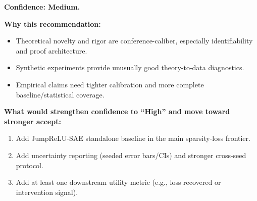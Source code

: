 \documentclass[11pt,a4paper]{article}
\begin{document}
\textbf{Confidence: Medium.}

\textbf{Why this recommendation:}
\begin{itemize}[leftmargin=*]
\item Theoretical novelty and rigor are conference-caliber, especially identifiability and proof architecture.
\item Synthetic experiments provide unusually good theory-to-data diagnostics.
\item Empirical claims need tighter calibration and more complete baseline/statistical coverage.
\end{itemize}

\textbf{What would strengthen confidence to ``High'' and move toward stronger accept:}
\begin{enumerate}[leftmargin=*]
\item Add JumpReLU-SAE standalone baseline in the main sparsity-loss frontier.
\item Add uncertainty reporting (seeded error bars/CIs) and stronger cross-seed protocol.
\item Add at least one downstream utility metric (e.g., loss recovered or intervention signal).
\end{enumerate}
\end{document}
